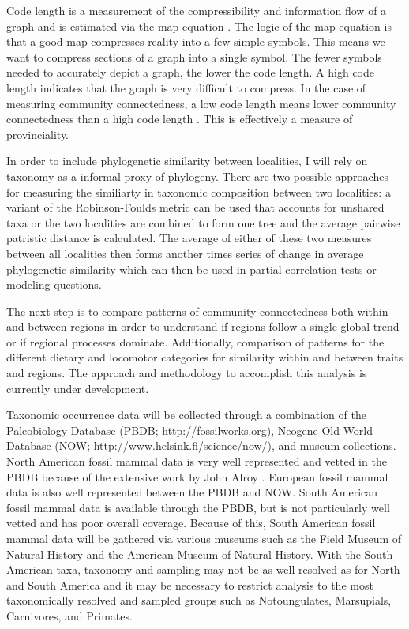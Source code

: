 \documentclass[12pt,letterpaper]{article}
\begin{document}
Code length is a measurement of the compressibility and information flow of a graph and is estimated via the map equation \citep{Rosvall2008,Rosvall2010b}. The logic of the map equation is that a good map compresses reality into a few simple symbols. This means we want to compress sections of a graph into a single symbol. The fewer symbols needed to accurately depict a graph, the lower the code length. A high code length indicates that the graph is very difficult to compress. In the case of measuring community connectedness, a low code length means lower community connectedness than a high code length \citep{Sidor2013}. This is effectively a measure of provinciality.

In order to include phylogenetic similarity between localities, I will rely on taxonomy as a informal proxy of phylogeny. There are two possible approaches for measuring the similiarty in taxonomic composition between two localities: a variant of the Robinson-Foulds metric \citep{Robinson1981} can be used that accounts for unshared taxa or the two localities are combined to form one tree and the average pairwise patristic distance \citep{Sokal1962} is calculated. The average of either of these two measures between all localities then forms another times series of change in average phylogenetic similarity which can then be used in partial correlation tests or modeling questions.

The next step is to compare patterns of community connectedness both within and between regions in order to understand if regions follow a single global trend or if regional processes dominate. Additionally, comparison of patterns for the different dietary and locomotor categories for similarity within and between traits and regions. The approach and methodology to accomplish this analysis is currently under development. 

Taxonomic occurrence data will be collected through a combination of the Paleobiology Database (PBDB; \url{http://fossilworks.org}), Neogene Old World Database (NOW; \url{http://www.helsink.fi/science/now/}), and museum collections. North American fossil mammal data is very well represented and vetted in the PBDB because of the extensive work by John Alroy \citep{Alroy1996a,Alroy1998,Alroy2000g}. European fossil mammal data is also well represented between the PBDB and NOW. South American fossil mammal data is available through the PBDB, but is not particularly well vetted and has poor overall coverage. Because of this, South American fossil mammal data will be gathered via various museums such as the Field Museum of Natural History and the American Museum of Natural History. With the South American taxa, taxonomy and sampling may not be as well resolved as for North and South America and it may be necessary to restrict analysis to the most taxonomically resolved and sampled groups such as Notoungulates, Marsupials, Carnivores, and Primates.
\end{document}
